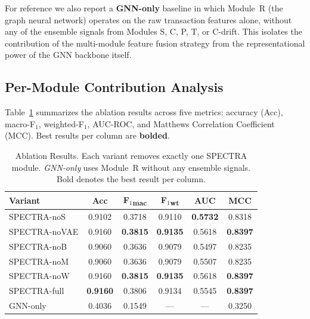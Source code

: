 \documentclass[journal]{IEEEtran}
\begin{document}
For reference we also report a \textbf{GNN-only} baseline in which Module~R
(the graph neural network) operates on the raw transaction features alone,
without any of the ensemble signals from Modules S, C, P, T, or C-drift.
This isolates the contribution of the multi-module feature fusion strategy
from the representational power of the GNN backbone itself.


\subsection{Per-Module Contribution Analysis}
\label{subsec:ablation_modules}

Table~\ref{tab:ablation} summarizes the ablation results across five metrics:
accuracy (Acc), macro-F$_1$, weighted-F$_1$, AUC-ROC, and Matthews
Correlation Coefficient (MCC).
Best results per column are \textbf{bolded}.

\begin{table}[t]
  \centering
  \renewcommand{\arraystretch}{1.15}
  \caption{Ablation Results. Each variant removes exactly one SPECTRA module.
           \textit{GNN-only} uses Module~R without any ensemble signals.
           Bold denotes the best result per column.}
  \label{tab:ablation}
  \begin{tabular}{@{}lccccc@{}}
    \toprule
    \textbf{Variant}
      & \textbf{Acc}
      & \textbf{F$_1$\textsubscript{mac}}
      & \textbf{F$_1$\textsubscript{wt}}
      & \textbf{AUC}
      & \textbf{MCC} \\
    \midrule
    SPECTRA-noS   & 0.9102 & 0.3718 & 0.9110 & \textbf{0.5732} & 0.8318 \\
    SPECTRA-noVAE & 0.9160 & \textbf{0.3815} & \textbf{0.9135} & 0.5618 & \textbf{0.8397} \\
    SPECTRA-noB   & 0.9060 & 0.3636 & 0.9079 & 0.5497 & 0.8235 \\
    SPECTRA-noM   & 0.9060 & 0.3636 & 0.9079 & 0.5507 & 0.8235 \\
    SPECTRA-noW   & 0.9160 & \textbf{0.3815} & \textbf{0.9135} & 0.5618 & \textbf{0.8397} \\
    \midrule
    SPECTRA-full  & \textbf{0.9160} & 0.3806 & 0.9134 & 0.5545 & \textbf{0.8397} \\
    \midrule[\heavyrulewidth]
    GNN-only      & 0.4036 & 0.1549 & --- & --- & 0.3250 \\
    \bottomrule
  \end{tabular}
\end{table}
\end{document}
